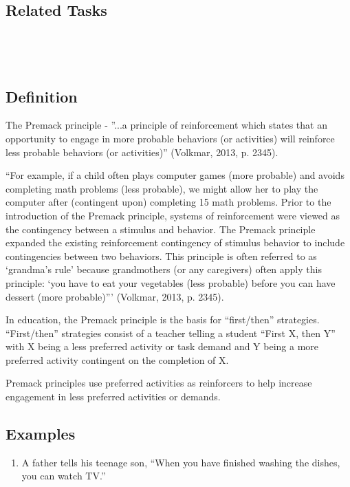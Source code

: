 \subsection{Related Tasks}
\foureFour{}\\
\fourFKFourtyTwo{}\\
%
\clearpage \section{\foureTen{}}
\subsection{Definition} 
The Premack principle - ''...a principle of reinforcement which states that an opportunity to engage in more probable behaviors (or activities) will reinforce less probable behaviors (or activities)'' (Volkmar, 2013, p. 2345).

``For example, if a child often plays computer games (more probable) and avoids completing math problems (less probable), we might allow her to play the computer after (contingent upon) completing 15 math problems. Prior to the introduction of the Premack principle, systems of reinforcement were viewed as the contingency between a stimulus and behavior. The Premack principle expanded the existing reinforcement contingency of stimulus behavior to include contingencies between two behaviors. This principle is often referred to as ‘grandma's rule' because grandmothers (or any caregivers) often apply this principle: ‘you have to eat your vegetables (less probable) before you can have dessert (more probable)''' (Volkmar, 2013, p. 2345).

In education, the Premack principle is the basis for ``first/then'' strategies. ``First/then'' strategies consist of a teacher telling a student ``First X, then Y'' with X being a less preferred activity or task demand and Y being a more preferred activity contingent on the completion of X.

Premack principles use preferred activities as reinforcers to help increase engagement in less preferred activities or demands. 

\subsection{Examples}
\begin{enumerate}
\item A father tells his teenage son, ``When you have finished washing the dishes, you can watch TV.''
\end{enumerate}
%
